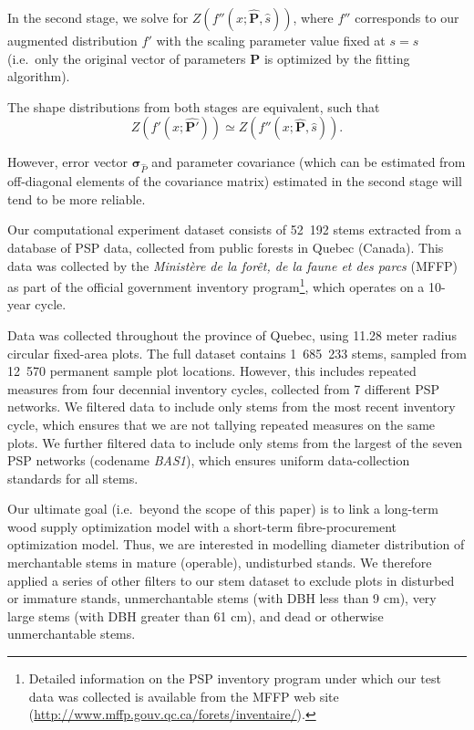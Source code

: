 \documentclass{article}
\begin{document}
In the second stage, we solve for  $Z(f''(x; \bm{\hat{P}}, \hat{s}))$, where $f''$ corresponds to our augmented distribution $f'$ with the scaling parameter value fixed at $s = \hat{s}$ (i.e.~only the original vector of parameters $\bm{P}$ is optimized by the fitting algorithm).

The shape distributions from both stages are equivalent, such that
\begin{equation}
 Z(f'(x; \bm{\hat{P'}})) \simeq Z(f''(x; \bm{\hat{P}}, \hat{s})). 
\end{equation}

However, error vector $\bm{\sigma}_{\hat{P}}$ and parameter covariance (which can be estimated from off-diagonal elements of the covariance matrix) estimated in the second stage will tend to be more reliable.


Our computational experiment dataset consists of 52~192 stems extracted from a database of PSP data, collected from public forests in Quebec (Canada). 
This data was collected by the \emph{Ministère de la forêt, de la faune et des parcs} (MFFP) as part of the official government inventory program\footnote{Detailed information on the
  PSP inventory program under which our test data was collected is available from the MFFP web site (\url{http://www.mffp.gouv.qc.ca/forets/inventaire/}).}, which operates on a 10-year cycle.

Data was collected throughout the province of Quebec, using 11.28 meter radius circular fixed-area plots.
The full dataset contains 1~685~233 stems, sampled from 12~570 permanent sample plot locations.
However, this includes repeated measures from four decennial inventory cycles, collected from 7 different PSP networks.
We filtered data to include only stems from the most recent inventory cycle, which ensures that we are not tallying repeated measures on the same plots.
We further filtered data to include only stems from the largest of the seven PSP networks (codename \emph{BAS1}), which ensures uniform data-collection standards for all stems.

Our ultimate goal (i.e.~beyond the scope of this paper) is to link a long-term wood supply optimization model with a short-term fibre-procurement optimization model.  
Thus, we are interested in modelling diameter distribution of merchantable stems in mature (operable), undisturbed stands.
We therefore applied a series of other filters to our stem dataset to exclude plots in disturbed or immature stands, unmerchantable stems (with DBH less than 9 cm), very large stems (with DBH greater than 61 cm), and dead or otherwise unmerchantable stems.
\end{document}
